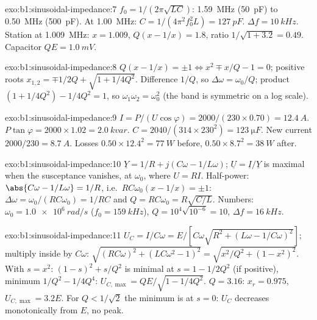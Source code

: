 \begin{solution}{exo:b1:sinusoidal-impedance:7}
$f_0 = 1/(2\pi\sqrt{LC})$: \qty{1.59}{MHz} (\qty{50}{pF}) to \qty{0.50}{MHz}
(\qty{500}{pF}). At \qty{1.00}{MHz}: $C = 1/(4\pi^2f_0^2L) = \qty{127}{pF}$.
$\Delta f = \qty{10}{kHz}$. Station at \qty{1.009}{MHz}: $x = 1.009$,
$Q(x - 1/x) = 1.8$, ratio $1/\sqrt{1 + 3.2} = 0.49$. Capacitor 
$QE = \qty{1.0}{mV}$.
\end{solution}

\begin{solution}{exo:b1:sinusoidal-impedance:8}
$Q(x - 1/x) = \pm1 \Leftrightarrow x^2 \mp x/Q - 1 = 0$; positive roots
$x_{1,2} = \mp 1/2Q + \sqrt{1 + 1/4Q^2}$. Difference $1/Q$, so
$\Delta\omega = \omega_0/Q$; product $(1 + 1/4Q^2) - 1/4Q^2 = 1$, so
$\omega_1\omega_2 = \omega_0^2$ (the band is symmetric on a log scale).
\end{solution}

\begin{solution}{exo:b1:sinusoidal-impedance:9}
$I = P/(U\cos\varphi) = 2000/(230 \times 0.70) = \qty{12.4}{A}$.  $P\tan\varphi = 2000 \times 1.02 = \qty{2.0}{kvar}$. $C = 2040/(314
\times 230^2) = \qty{123}{\micro F}$. New current $2000/230 = \qty{8.7}{A}$.
Losses $0.50 \times 12.4^2 = \qty{77}{W}$ before, $0.50 \times 8.7^2 =
\qty{38}{W}$ after.
\end{solution}

\begin{solution}{exo:b1:sinusoidal-impedance:10}
$\underline Y = 1/R + j(C\omega - 1/L\omega)$; $\underline U = \underline I/
\underline Y$ is maximal when the susceptance vanishes, at $\omega_0$,
where $U = RI$. Half-power: $\abs{C\omega - 1/L\omega} = 1/R$, i.e.\
$RC\omega_0(x - 1/x) = \pm1$: $\Delta\omega = \omega_0/(RC\omega_0) = 1/RC$
and $Q = RC\omega_0 = R\sqrt{C/L}$. Numbers: $\omega_0 = \qty{1.0e6}{rad/s}$
($f_0 = \qty{159}{kHz}$), $Q = 10^4\sqrt{10^{-6}} = 10$, $\Delta f =
\qty{16}{kHz}$.
\end{solution}

\begin{solution}{exo:b1:sinusoidal-impedance:11}
$U_C = I/C\omega = E/[C\omega\sqrt{R^2 + (L\omega - 1/C\omega)^2}]$;
multiply inside by $C\omega$: $\sqrt{(RC\omega)^2 + (LC\omega^2 - 1)^2} =
\sqrt{x^2/Q^2 + (1 - x^2)^2}$. With $s = x^2$: $(1 - s)^2 + s/Q^2$ is
minimal at $s = 1 - 1/2Q^2$ (if positive), minimum $1/Q^2 - 1/4Q^4$:
$U_{C,\max} = QE/\sqrt{1 - 1/4Q^2}$. $Q = 3.16$: $x_r = 0.975$,
$U_{C,\max} = 3.2E$. For $Q < 1/\sqrt2$ the minimum is at $s = 0$: $U_C$
decreases monotonically from $E$, no peak.
\end{solution}

